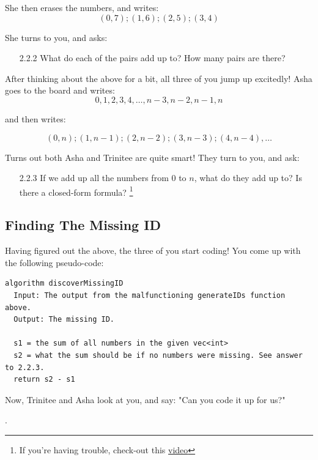 \documentclass [12pt]{article}
\begin{document}
She then erases the numbers, and writes:
$$
(0, 7); (1, 6); (2, 5); (3, 4)
$$

She turns to you, and asks:

\begin{enumerate}
    \item [2.2.2]  What do each of the pairs add up to? How many pairs are there?
\end{enumerate}

After thinking about the above for a bit, all three of you jump up excitedly! Asha goes to the board and writes:
$$
0, 1, 2, 3, 4, \dots, n-3, n-2, n-1, n
$$

and then writes:

$$
(0, n); (1, n-1); (2, n-2); (3, n-3); (4, n-4), \dots
$$

Turns out both Asha and Trinitee are quite smart! They turn to you, and ask:

\begin{enumerate}
    \item [2.2.3]  If we add up all the numbers from $0$ to $n$, what do they add up to? Is there a closed-form formula? \footnote{If you're having trouble, check-out this \href{https://www.youtube.com/watch?v=aaFrAFZATKU&t=343s}{video}}
\end{enumerate}



\subsection{Finding The Missing ID}
 Having figured out the above, the three of you start coding! You come up with the following pseudo-code:

\begin{verbatim}
algorithm discoverMissingID
  Input: The output from the malfunctioning generateIDs function above.
  Output: The missing ID.

  s1 = the sum of all numbers in the given vec<int>
  s2 = what the sum should be if no numbers were missing. See answer to 2.2.3.
  return s2 - s1
\end{verbatim}

Now, Trinitee and Asha look at you, and say: "Can you code it up for us?"

.
\end{document}
